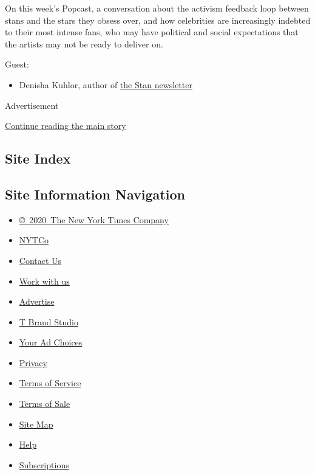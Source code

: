 On this week's Popcast, a conversation about the activism feedback loop
between stans and the stars they obsess over, and how celebrities are
increasingly indebted to their most intense fans, who may have political
and social expectations that the artists may not be ready to deliver on.

Guest:

\begin{itemize}
\tightlist
\item
  Denisha Kuhlor, author of \href{http://astan.substack.com}{the Stan
  newsletter}
\end{itemize}

Advertisement

\protect\hyperlink{after-bottom}{Continue reading the main story}

\hypertarget{site-index}{%
\subsection{Site Index}\label{site-index}}

\hypertarget{site-information-navigation}{%
\subsection{Site Information
Navigation}\label{site-information-navigation}}

\begin{itemize}
\tightlist
\item
  \href{https://help.nytimes3xbfgragh.onion/hc/en-us/articles/115014792127-Copyright-notice}{©~2020~The
  New York Times Company}
\end{itemize}

\begin{itemize}
\tightlist
\item
  \href{https://www.nytco.com/}{NYTCo}
\item
  \href{https://help.nytimes3xbfgragh.onion/hc/en-us/articles/115015385887-Contact-Us}{Contact
  Us}
\item
  \href{https://www.nytco.com/careers/}{Work with us}
\item
  \href{https://nytmediakit.com/}{Advertise}
\item
  \href{http://www.tbrandstudio.com/}{T Brand Studio}
\item
  \href{https://www.nytimes3xbfgragh.onion/privacy/cookie-policy\#how-do-i-manage-trackers}{Your
  Ad Choices}
\item
  \href{https://www.nytimes3xbfgragh.onion/privacy}{Privacy}
\item
  \href{https://help.nytimes3xbfgragh.onion/hc/en-us/articles/115014893428-Terms-of-service}{Terms
  of Service}
\item
  \href{https://help.nytimes3xbfgragh.onion/hc/en-us/articles/115014893968-Terms-of-sale}{Terms
  of Sale}
\item
  \href{https://spiderbites.nytimes3xbfgragh.onion}{Site Map}
\item
  \href{https://help.nytimes3xbfgragh.onion/hc/en-us}{Help}
\item
  \href{https://www.nytimes3xbfgragh.onion/subscription?campaignId=37WXW}{Subscriptions}
\end{itemize}
